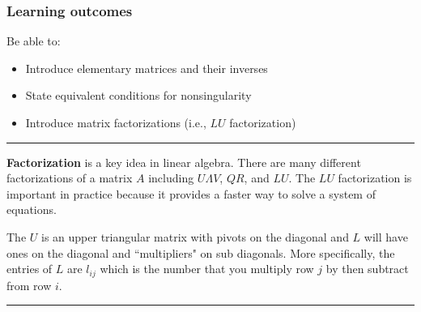  





\subsubsection*{Learning outcomes}
Be able to:
\begin{itemize}
\item Introduce elementary matrices and their inverses
	\item State equivalent conditions for nonsingularity
	\item Introduce matrix factorizations (i.e., $LU$ factorization)
	
\end{itemize}





\rule[0.01in]{\textwidth}{0.0025in}


%
%


\textbf{Factorization} is a key idea in linear algebra.  There are many different factorizations of a matrix $A$ including $U\Lambda V$, $QR$, and $LU$.  The $LU$ factorization is important in practice because it provides a faster way to solve a system of equations.  


The $U$ is an upper triangular matrix with pivots on the diagonal and $L$ will have ones on the diagonal and ``multipliers" on sub diagonals.    More specifically, the entries of $L$ are $l_{ij}$ which is the number that you multiply row $j$ by then subtract from row $i$.  


\rule[0.01in]{\textwidth}{0.0025in}



